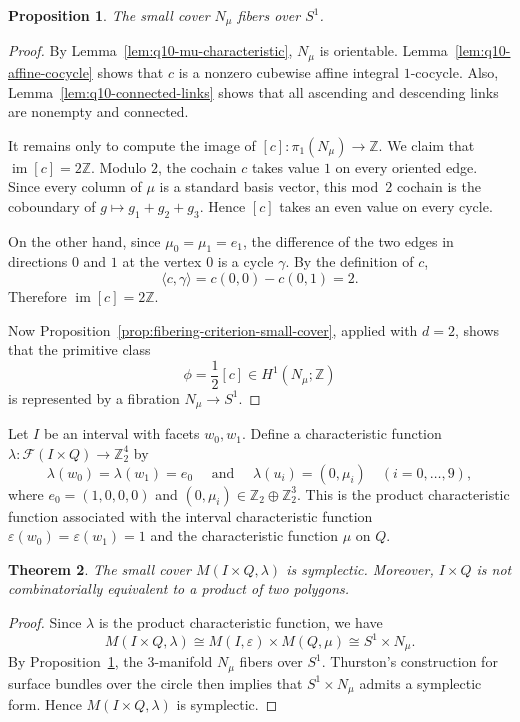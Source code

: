 \documentclass{amsart}
\newtheorem{theorem}{Theorem}[section]
\newtheorem{proposition}[theorem]{Proposition}
\numberwithin{equation}{section}
\theoremstyle{definition}
\theoremstyle{remark}
\newcommand{\Z}{\mathbb Z}
\newcommand{\cF}{\mathcal F}
\DeclareMathOperator{\im}{im}
\begin{document}
\begin{proposition}\label{prop:q10-N-mu-fibered}
    The small cover $N_\mu$ fibers over $S^1$.
\end{proposition}
\begin{proof}
    By Lemma~\ref{lem:q10-mu-characteristic}, $N_\mu$ is orientable.
    Lemma~\ref{lem:q10-affine-cocycle} shows that $c$ is a nonzero cubewise affine integral $1$-cocycle.
    Also, Lemma~\ref{lem:q10-connected-links} shows that all ascending and descending links are nonempty and connected.

    It remains only to compute the image of $[c]\colon \pi_1(N_\mu)\to \Z$.
    We claim that $\im[c]=2\Z$.
    Modulo $2$, the cochain $c$ takes value $1$ on every oriented edge.
    Since every column of $\mu$ is a standard basis vector, this mod~$2$ cochain is the coboundary of $g\longmapsto g_1+g_2+g_3$.
    Hence $[c]$ takes an even value on every cycle.

    On the other hand, since $\mu_0=\mu_1=e_1$, the difference of the two edges in directions $0$ and $1$ at the vertex $0$ is a cycle $\gamma$.
    By the definition of $c$,
    $$
        \langle c,\gamma\rangle=c(0,0)-c(0,1)=2.
    $$
    Therefore $\im[c]=2\Z$.

    Now Proposition~\ref{prop:fibering-criterion-small-cover}, applied with $d=2$, shows that the primitive class
    $$
        \phi=\frac{1}{2}[c]\in H^1(N_\mu;\Z)
    $$
    is represented by a fibration $N_\mu\to S^1$.
\end{proof}

Let $I$ be an interval with facets $w_0,w_1$.  
Define a characteristic function $\lambda\colon\cF(I\times Q)\to \Z_2^4$ by
$$
    \lambda(w_0)=\lambda(w_1)=e_0 \quad \text{ and } \quad \lambda(u_i)=(0,\mu_i) \quad (i=0,\ldots,9),
$$
where $e_0=(1,0,0,0)$ and $(0,\mu_i)\in \Z_2\oplus \Z_2^3$.  
This is the product characteristic function associated with the interval characteristic function $\varepsilon(w_0)=\varepsilon(w_1)=1$ and the characteristic function $\mu$ on $Q$.

\begin{theorem}\label{thm:q10-product-compatible-example}
    The small cover $M(I\times Q,\lambda)$ is symplectic. 
    Moreover, $I\times Q$ is not combinatorially equivalent to a product of two polygons.
\end{theorem}
\begin{proof}
    Since $\lambda$ is the product characteristic function, we have 
    $$
        M(I\times Q,\lambda)\cong M(I,\varepsilon)\times M(Q,\mu)\cong S^1\times N_\mu.
    $$
    By Proposition~\ref{prop:q10-N-mu-fibered}, the $3$-manifold $N_\mu$ fibers over $S^1$.  
    Thurston's construction for surface bundles over the circle then implies that $S^1\times N_\mu$ admits a symplectic form.  
    Hence $M(I\times Q,\lambda)$ is symplectic.
\end{proof}
\end{document}
